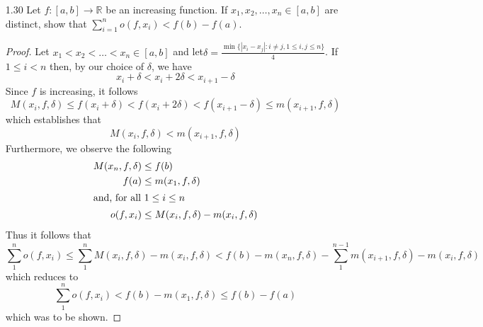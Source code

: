\begin{enumerate}
    \item[1.30] Let \( f:[a,b] \rightarrow \mathbb{R} \) be an increasing function. If \( x_1,x_2,\ldots, x_n \in [a,b] \) are distinct, show that \( \sum_{i=1}^n o(f,x_i) < f(b)-f(a) \).
    
    \begin{proof}
    Let \( x_1 < x_2 < \ldots < x_n \in [a,b] \) and let\( \delta = \frac{\min \{ \left| x_i-x_j \right|: i\neq j, 1 \leq i,j \leq n \}}{4} \). If \( 1 \leq i < n \) then, by our choice of \( \delta \), we have
    \[
    x_i + \delta < x_i + 2 \delta < x_{i+1}-\delta
    \]
    Since \( f \) is increasing, it follows
    \[
    M(x_i,f,\delta) \leq f(x_i + \delta) < f(x_i + 2 \delta) < f(x_{i+1}-\delta) \leq m(x_{i+1},f,\delta)
    \]
    which establishes that
    \[
    M(x_i,f,\delta) < m(x_{i+1},f,\delta)
    \]
    Furthermore, we observe the following
    \begin{align*}
    M(x_n, f, \delta) &\leq f(b) \\
    f(a) &\leq m(x_1,f,\delta) \\
    \intertext{and, for all \( 1 \leq i \leq n \)}
    o(f,x_i) &\leq M(x_i, f, \delta) - m(x_i, f, \delta)
    \end{align*}
    Thus it follows that
    \[
    \sum_1^n o(f,x_i) \leq \sum_1^n M(x_i,f,\delta)-m(x_i,f,\delta) < f(b) - m(x_n, f, \delta) - \sum_1^{n-1} m(x_{i+1},f,\delta) - m(x_i,f,\delta) 
    \]
    which reduces to
    \[
    \sum_1^n o(f,x_i) < f(b) - m(x_1,f,\delta) \leq f(b)-f(a)
    \]
    which was to be shown. 
    \end{proof}
\end{enumerate}